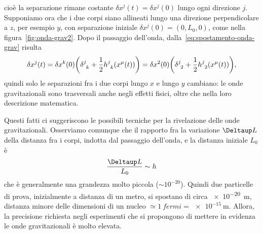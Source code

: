 cioè la separazione rimane costante $\delta x^{j}(t) = \delta x^{j}(0)$ lungo
ogni direzione $j$.  Supponiamo ora che i due corpi siano allineati lungo una
direzione perpendicolare a $z$, per esempio $y$, con separazione iniziale
$\delta x^{j}(0) = (0,L_{0},0)$, come nella figura~\ref{fig:onda-grav2}.  Dopo
il passaggio dell'onda, dalla~\eqref{eq:spostamento-onda-grav} risulta
\begin{equation}
  \delta x^{j}(t) = \delta x^{k}(0) \bigg(\tensor{\delta}{^{j}_{k}} +
  \frac{1}{2}\tensor{h}{^{j}_{k}}(x^{\mu}(t))\bigg) = \delta
  x^{2}(0)\bigg(\tensor{\delta}{^{j}_{2}} +
  \frac{1}{2}\tensor{h}{^{j}_{2}}(x^{\mu}(t))\bigg),
\end{equation}
quindi solo le separazioni fra i due corpi lungo $x$ e lungo $y$ cambiano: le
onde gravitazionali sono trasversali anche negli effetti fisici, oltre che nella
loro descrizione matematica.

Questi fatti ci suggeriscono le possibili tecniche per la rivelazione delle onde
gravitazionali.  Osserviamo comunque che il rapporto fra la variazione $\var L$
della distanza fra i corpi, indotta dal passaggio dell'onda, e la distanza
iniziale $L_{0}$ è
\begin{equation}
  \frac{\var L}{L_{0}} \sim h
\end{equation}
che è generalmente una grandezza molto piccola ($\sim 10^{-20}$).  Quindi due
particelle di prova, inizialmente a distanza di un metro, si spostano di circa
\SI{e-20}{\metre}, distanza minore delle dimensioni di un nucleo $\simeq
\SI{1}{fermi} = \SI{e-15}{\metre}$.  Allora, la precisione richiesta negli
esperimenti che si propongono di mettere in evidenza le onde gravitazionali è
molto elevata.

